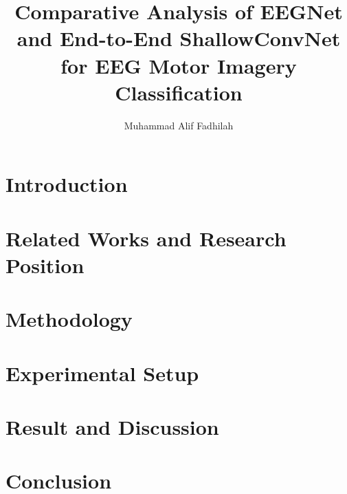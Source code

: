 \documentclass[preprint,12pt]{elsarticle}
\begin{document}
\begin{frontmatter}

\title{Comparative Analysis of EEGNet and End-to-End ShallowConvNet for EEG Motor Imagery Classification}

\author[ugm]{Muhammad Alif Fadhilah}

\address[ugm]{NIM: 24/552180/PTK/16441 \\ Department of Electrical Engineering, Universitas Gadjah Mada, Yogyakarta, Indonesia}



\end{frontmatter}


\section{Introduction}


\section{Related Works and Research Position}


\section{Methodology}


\section{Experimental Setup}


\section{Result and Discussion}


\section{Conclusion}




\end{document}
